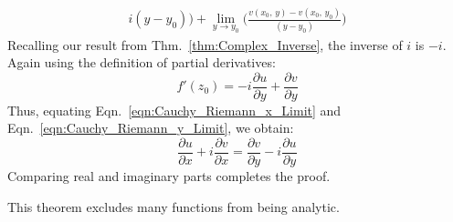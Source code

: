 \begin{bproof}
\begin{subequations}
\begin{align}
                              {i(y-y_{0})}\Big)
                +\underset{y\rightarrow{y_{0}}}{\lim}
                    \Big(\frac{v(x_{0},\,y)-v(x_{0},\,y_{0})}
                              {(y-y_{0})}\Big)
            \end{align}
        \end{subequations}
        Recalling our result from Thm.~\ref{thm:Complex_Inverse}, the
        inverse of $i$ is $\minus{i}$. Again using the definition of
        partial derivatives:
        \begin{equation}
            \label{eqn:Cauchy_Riemann_y_Limit}%
            f'(z_{0})=-i\frac{\partial{u}}{\partial{y}}+
                        \frac{\partial{v}}{\partial{y}}
        \end{equation}
        Thus, equating
        Eqn.~\ref{eqn:Cauchy_Riemann_x_Limit} and
        Eqn.~\ref{eqn:Cauchy_Riemann_y_Limit}, we obtain:
        \begin{equation}
              \frac{\partial{u}}{\partial{x}}
            +i\frac{\partial{v}}{\partial{x}}
            = \frac{\partial{v}}{\partial{y}}
            -i\frac{\partial{u}}{\partial{y}}
        \end{equation}
        Comparing real and imaginary parts completes the proof.
    \end{bproof}
    This theorem excludes many functions from being analytic.
